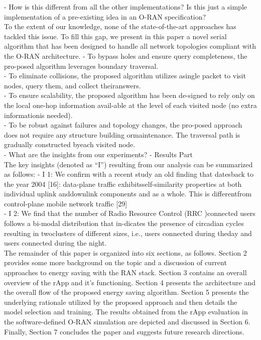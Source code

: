 - How is this different from all the other implementations? Is this just a simple implementation of a pre-existing idea in an O-RAN specification?\\
To the extent of our knowledge, none of the state-of-the-art approaches has tackled this issue. To fill this gap, we present in this paper a novel serial algorithm that has been designed to handle all network topologies compliant with the O-RAN architecture.
- To bypass holes and ensure query completeness, the pro-posed algorithm leverages boundary traversal.\\
- To eliminate collisions, the proposed algorithm utilizes asingle packet to visit nodes, query them, and collect theiranswers.\\
- To ensure scalability, the proposed algorithm has been de-signed to rely only on the local one-hop information avail-able at the level of each visited node (no extra informationis needed).\\
- To be robust against failures and topology changes, the pro-posed approach does not require any structure building ormaintenance. The traversal path is gradually constructed byeach visited node. \\

- What are the insights from our experiments? - Results Part \\
The key insights (denoted as “I”) resulting from our analysis can be summarized as follows:
- I 1: We confirm with a recent study an old finding that datesback to the year 2004 [16]: data-plane traffic exhibitsself-similarity properties at both individual uplink anddownlink components and as a whole. This is differentfrom control-plane mobile network traffic [29] \\
- I 2: We find that the number of Radio Resource Control (RRC )connected users follows a bi-modal distribution that in-dicates the presence of circadian cycles resulting in twoclusters of different sizes, i.e., users connected during theday and users connected during the night. \\

The remainder of this paper is organized into six sections, as follows. Section 2 provides some more background on the topic and a discussion of current approaches to energy saving with the RAN stack. Section 3 contains an overall overview of the rApp and it's functioning. Section 4 presents the architecture and the overall flow of the proposed energy saving algorithm. Section 5 presents the underlying rationale utilized by the proposed approach and then details the model selection and training. The results obtained from the rApp evaluation in the software-defined O-RAN simulation are depicted and discussed in Section 6. Finally, Section 7 concludes the paper and suggests future research directions.\\